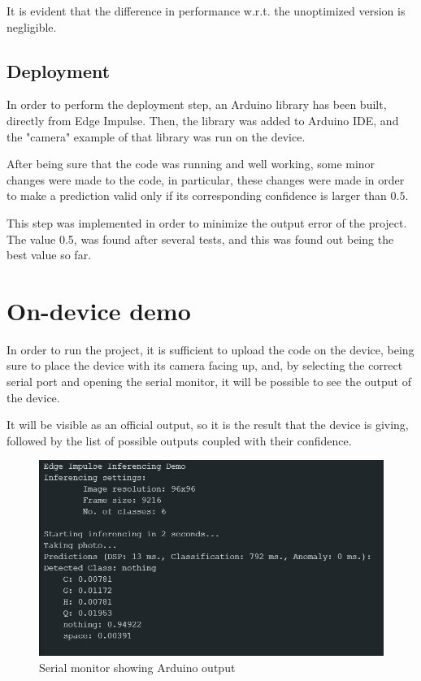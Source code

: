 \documentclass{Configuration_Files/PoliMi3i_thesis}
\begin{document}
It is evident that the difference in performance w.r.t. the unoptimized version is negligible. 


\section{Deployment}
\label{sec:5-v2-deployment}
In order to perform the deployment step, an Arduino library has been built, directly from Edge Impulse. Then, the library was added to Arduino IDE, and the "camera" example of that library was run on the device.

After being sure that the code was running and well working, some minor changes were made to the code, in particular, these changes were made in order to make a prediction valid only if its corresponding confidence is larger than $0.5$.

This step was implemented in order to minimize the output error of the project. The value 0.5, was found after several tests, and this was found out being the best value so far.


\chapter{On-device demo}
\label{ch:demo}%
In order to run the project, it is sufficient to upload the code on the device, being sure to place the device with its camera facing up, and, by selecting the correct serial port and opening the serial monitor, it will be possible to see the output of the device.

It will be visible as an official output, so it is the result that the device is giving, followed by the list of possible outputs coupled with their confidence.

\begin{figure}[H]
    \centering
    \includegraphics[width=1\linewidth]{inferencing img.png}
    \caption{Serial monitor showing Arduino output}
    \label{fig:demo}
\end{figure}
\end{document}
